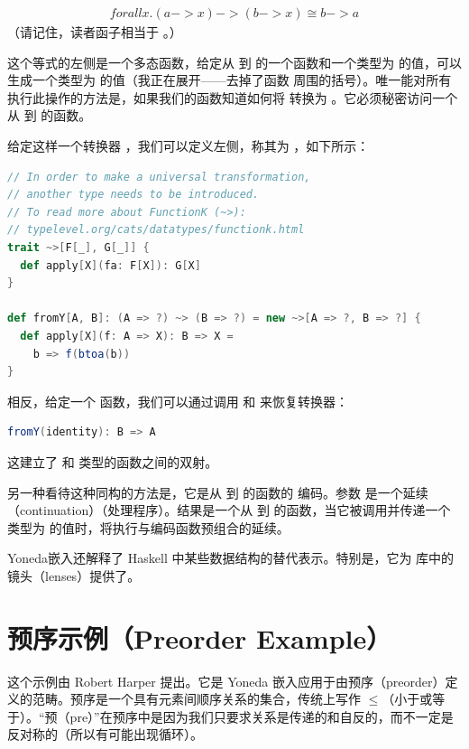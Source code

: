 \begin{align}
  forall x. (a -> x) -> (b -> x) \ensuremath{\cong} b -> a
\end{align}
（请记住，读者函子相当于 。）

这个等式的左侧是一个多态函数，给定从  到  的一个函数和一个类型为  的值，可以生成一个类型为  的值（我正在展开——去掉了函数  周围的括号）。唯一能对所有  执行此操作的方法是，如果我们的函数知道如何将  转换为 。它必须秘密访问一个从  到  的函数。

给定这样一个转换器 ，我们可以定义左侧，称其为 ，如下所示：

\begin{lstlisting}[language=Scala]
// In order to make a universal transformation,
// another type needs to be introduced.
// To read more about FunctionK (~>):
// typelevel.org/cats/datatypes/functionk.html
trait ~>[F[_], G[_]] {
  def apply[X](fa: F[X]): G[X]
}

def fromY[A, B]: (A => ?) ~> (B => ?) = new ~>[A => ?, B => ?] {
  def apply[X](f: A => X): B => X =
    b => f(btoa(b))
}
\end{lstlisting}
相反，给定一个  函数，我们可以通过调用  和  来恢复转换器：

\begin{lstlisting}[language=Scala]
fromY(identity): B => A
\end{lstlisting}
这建立了  和  类型的函数之间的双射。

另一种看待这种同构的方法是，它是从  到  的函数的 编码。参数  是一个延续（continuation）（处理程序）。结果是一个从  到  的函数，当它被调用并传递一个类型为  的值时，将执行与编码函数预组合的延续。

Yoneda嵌入还解释了 Haskell 中某些数据结构的替代表示。特别是，它为  库中的镜头（lenses）提供了。

\section{预序示例（Preorder Example）}

这个示例由 Robert Harper 提出。它是 Yoneda 嵌入应用于由预序（preorder）定义的范畴。预序是一个具有元素间顺序关系的集合，传统上写作 $\leqslant$（小于或等于）。“预（pre）”在预序中是因为我们只要求关系是传递的和自反的，而不一定是反对称的（所以有可能出现循环）。

